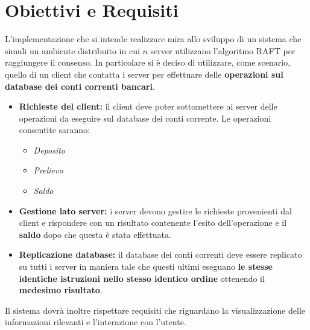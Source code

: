 \section{Obiettivi e Requisiti}
	L'implementazione che si intende realizzare mira allo sviluppo di un sistema che simuli un ambiente distribuito in cui $n$ server utilizzano l'algoritmo RAFT per raggiungere il consenso. In particolare si è deciso di utilizzare, come scenario, quello di un client che contatta i server per effettuare delle \textbf{ operazioni sul database dei conti correnti bancari}.
	\begin{itemize}
			\item \textbf{Richieste del client:} il client deve poter sottomettere ai server delle operazioni da eseguire sul database dei conti corrente. Le operazioni consentite saranno:
				\begin{itemize}
					\item \emph{Deposito}
					\item \emph{Prelievo}
					\item \emph{Saldo}
				\end{itemize}
			\item \textbf{Gestione lato server:} i server devono gestire le richieste provenienti dal client e rispondere con un risultato contenente l'esito dell'operazione e il \textbf{saldo} dopo che questa è stata effettuata.
			\item \textbf{Replicazione database:} il database dei conti correnti deve essere replicato su tutti i server in maniera tale che questi ultimi eseguano \textbf{le stesse identiche istruzioni nello stesso identico ordine} ottenendo il \textbf{medesimo risultato}.
		\end{itemize}

	Il sistema dovrà inoltre rispettare requisiti che riguardano la visualizzazione delle informazioni rilevanti e l'interazione con l'utente.


